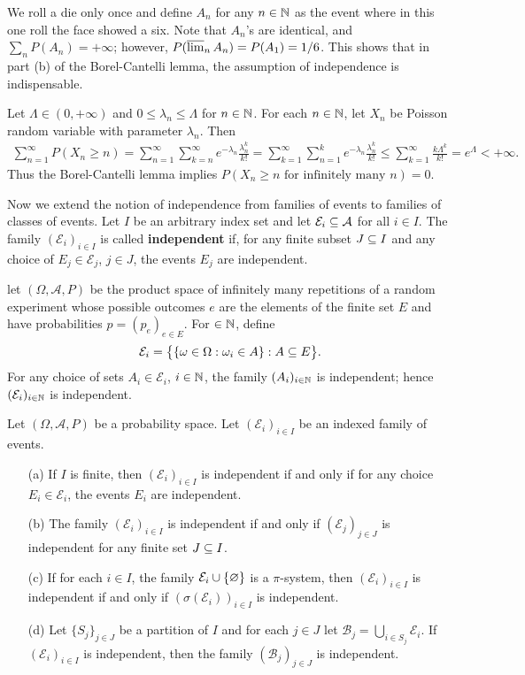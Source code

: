 \begin{example}
We roll a die only once and define $A_n$ for any $n\in\mathbb{N}$ as the event where in this one roll the face showed a six. Note that $A_n$'s are identical, and $\sum_nP(A_n)=+\infty$; however, $P(\varlimsup_nA_n)=P(A_1)=1/6$. This shows that in part (b) of the Borel-Cantelli lemma, the assumption of independence is indispensable.
\end{example}
\begin{example}
Let $\Lambda\in(0,+\infty)$ and $0\leq\lambda_n\leq\Lambda$ for $n\in\mathbb{N}$. For each $n\in\mathbb{N}$, let $X_n$ be Poisson random variable with parameter $\lambda_n$. Then
\begin{align*}
\sum_{n=1}^{\infty}P(X_n\geq n)=\sum_{n=1}^{\infty}\sum_{k=n}^{\infty}e^{-\lambda_n}\frac{\lambda_n^k}{k!}=\sum_{k=1}^{\infty}\sum_{n=1}^{k}e^{-\lambda_n}\frac{\lambda_n^k}{k!}\leq\sum_{k=1}^{\infty}\frac{k\Lambda^k}{k!}=e^{\Lambda}<+\infty.
\end{align*}
Thus the Borel-Cantelli lemma implies $P(X_n\geq n\text{ for infinitely many $n$})=0$.
\end{example}
Now we extend the notion of independence from families of events to families of classes of events. Let $I$ be an arbitrary index set and let $\mathcal{E}_i\subseteq\mathcal{A}$ for all $i\in I$. The family $(\mathcal{E}_i)_{i\in I}$ is called \textbf{independent} if, for any finite subset $J\subseteq I$ and any choice of $E_j\in\mathcal{E}_j$, $j\in J$, the events $E_j$ are independent.
\begin{example}
let $(\Omega,\mathcal{A},P)$ be the product space of infinitely many repetitions of a random experiment whose possible outcomes $e$ are the elements of the finite set $E$ and have probabilities $p=(p_e)_{e\in E}$. For $\in\mathbb{N}$, define
\[\mathcal{E}_i=\big\{\{\omega\in\Omega:\omega_i\in A\}:A\subseteq E\big\}.\]
For any choice of sets $A_i\in\mathcal{E}_i$, $i\in\mathbb{N}$, the family $(A_i)_{i\in\mathbb{N}}$ is independent; hence $(\mathcal{E}_i)_{i\in\mathbb{N}}$ is independent.
\end{example}
\begin{theorem}\label{independent family prop}
Let $(\Omega,\mathcal{A},P)$ be a probability space. Let $(\mathcal{E}_i)_{i\in I}$ be an indexed family of events.
\begin{itemize}
\item[(a)] If $I$ is finite, then $(\mathcal{E}_i)_{i\in I}$ is independent if and only if for any choice $E_i\in\mathcal{E}_i$, the events $E_i$ are independent.
\item[(b)] The family $(\mathcal{E}_i)_{i\in I}$ is independent if and only if $(\mathcal{E}_j)_{j\in J}$ is independent for any finite set $J\subseteq I$. 
\item[(c)] If for each $i\in I$, the family $\mathcal{E}_i\cup\{\varnothing\}$ is a $\pi$-system, then $(\mathcal{E}_i)_{i\in I}$ is independent if and only if $(\sigma(\mathcal{E}_i))_{i\in I}$ is independent.
\item[(d)] Let $\{S_j\}_{j\in J}$ be a partition of $I$ and for each $j\in J$ let $\mathcal{B}_j=\bigcup_{i\in S_j}\mathcal{E}_i$. If $(\mathcal{E}_i)_{i\in I}$ is independent, then the family $(\mathcal{B}_j)_{j\in J}$ is independent. 
\end{itemize}
\end{theorem}
